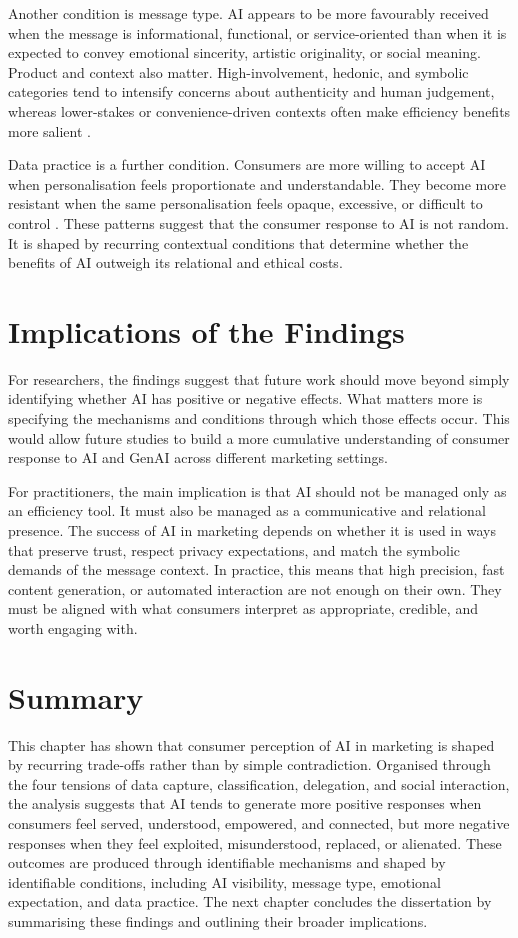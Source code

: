 Another condition is message type. AI appears to be more favourably received when the message is informational, functional, or service-oriented than when it is expected to convey emotional sincerity, artistic originality, or social meaning. Product and context also matter. High-involvement, hedonic, and symbolic categories tend to intensify concerns about authenticity and human judgement, whereas lower-stakes or convenience-driven contexts often make efficiency benefits more salient \cite{belanche2025images,arango2023charitable}.

Data practice is a further condition. Consumers are more willing to accept AI when personalisation feels proportionate and understandable. They become more resistant when the same personalisation feels opaque, excessive, or difficult to control \cite{boerman2017oba,srivastava2026social}. These patterns suggest that the consumer response to AI is not random. It is shaped by recurring contextual conditions that determine whether the benefits of AI outweigh its relational and ethical costs.

\section{Implications of the Findings}
For researchers, the findings suggest that future work should move beyond simply identifying whether AI has positive or negative effects. What matters more is specifying the mechanisms and conditions through which those effects occur. This would allow future studies to build a more cumulative understanding of consumer response to AI and GenAI across different marketing settings.

For practitioners, the main implication is that AI should not be managed only as an efficiency tool. It must also be managed as a communicative and relational presence. The success of AI in marketing depends on whether it is used in ways that preserve trust, respect privacy expectations, and match the symbolic demands of the message context. In practice, this means that high precision, fast content generation, or automated interaction are not enough on their own. They must be aligned with what consumers interpret as appropriate, credible, and worth engaging with.

\section{Summary}
This chapter has shown that consumer perception of AI in marketing is shaped by recurring trade-offs rather than by simple contradiction. Organised through the four tensions of data capture, classification, delegation, and social interaction, the analysis suggests that AI tends to generate more positive responses when consumers feel served, understood, empowered, and connected, but more negative responses when they feel exploited, misunderstood, replaced, or alienated. These outcomes are produced through identifiable mechanisms and shaped by identifiable conditions, including AI visibility, message type, emotional expectation, and data practice. The next chapter concludes the dissertation by summarising these findings and outlining their broader implications.
